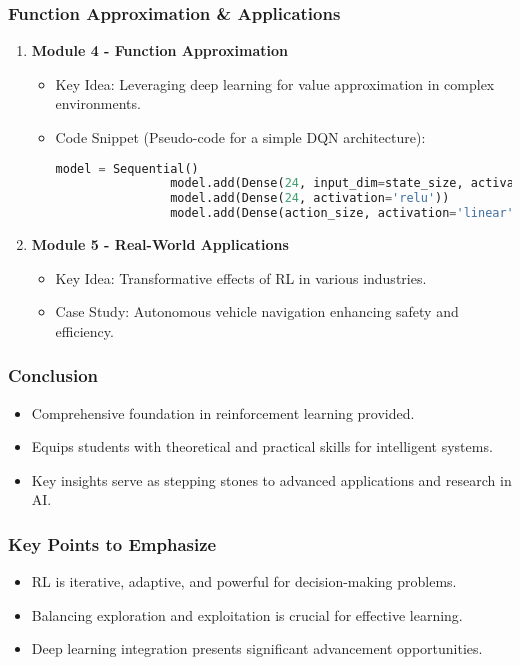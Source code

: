 \documentclass[aspectratio=169]{beamer}
\begin{document}
\begin{frame}[fragile]
    \frametitle{Function Approximation \& Applications}
    \begin{enumerate}
        \item \textbf{Module 4 - Function Approximation}
            \begin{itemize}
                \item Key Idea: Leveraging deep learning for value approximation in complex environments.
                \item Code Snippet (Pseudo-code for a simple DQN architecture):
                \begin{lstlisting}[language=Python]
                model = Sequential()
                model.add(Dense(24, input_dim=state_size, activation='relu'))
                model.add(Dense(24, activation='relu'))
                model.add(Dense(action_size, activation='linear'))
                \end{lstlisting}
            \end{itemize}
        \item \textbf{Module 5 - Real-World Applications}
            \begin{itemize}
                \item Key Idea: Transformative effects of RL in various industries.
                \item Case Study: Autonomous vehicle navigation enhancing safety and efficiency.
            \end{itemize}
    \end{enumerate}
\end{frame}

\begin{frame}[fragile]
    \frametitle{Conclusion}
    \begin{itemize}
        \item Comprehensive foundation in reinforcement learning provided.
        \item Equips students with theoretical and practical skills for intelligent systems.
        \item Key insights serve as stepping stones to advanced applications and research in AI.
    \end{itemize}
\end{frame}

\begin{frame}[fragile]
    \frametitle{Key Points to Emphasize}
    \begin{itemize}
        \item RL is iterative, adaptive, and powerful for decision-making problems.
        \item Balancing exploration and exploitation is crucial for effective learning.
        \item Deep learning integration presents significant advancement opportunities.
    \end{itemize}
\end{frame}
\end{document}
